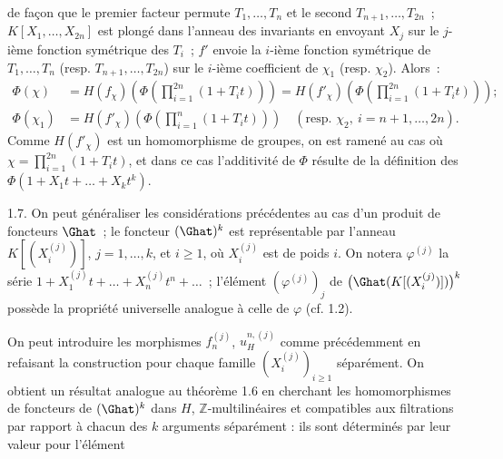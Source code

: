 
de façon que le
premier facteur permute \(T_1,\ldots,T_n\) et le second \(T_{n+1},\ldots,T_{2n}\)~; \(K[X_1,\ldots,X_{2n}]\) est plongé dans l'anneau des invariants en envoyant \(X_j\) sur le \(j\)-ième fonction symétrique des \(T_i\)~; \(f'\) envoie la \(i\)-ième fonction symétrique de \(T_1,\ldots,T_n\) (resp. \(T_{n+1},\ldots,T_{2n}\)) sur le \(i\)-ième coefficient de \(\chi_1\) (resp. \(\chi_2\)). Alors~:
\[
\begin{aligned}
\Phi(\chi)
&=H(f_\chi)\left(\Phi\left(\prod_{i=1}^{2n}(1+T_it)\right)\right)
=H(f'_\chi)\left(\Phi\left(\prod_{i=1}^{2n}(1+T_it)\right)\right);\\
\Phi(\chi_1) &=H(f'_\chi)\left(\Phi\left(\prod_{i=1}^{n}(1+T_it)\right)\right)\quad(\text{resp. }\chi_2,\ i=n+1,\ldots,2n).
\end{aligned}
\]
Comme \(H(f'_\chi)\) est un homomorphisme de groupes, on est ramené au cas où \(\chi=\prod_{i=1}^{2n}(1+T_it)\), et dans ce cas l'additivité de \(\Phi\) résulte de la définition des \(\Phi(1+X_1t+\ldots+X_k t^k)\).

1.7. On peut généraliser les considérations précédentes au cas d'un produit de foncteurs \(\Ghat\)~; le foncteur \((\Ghat)^k\) est représentable par l'anneau
\(K[(X_i^{(j)})]\), \(j=1,\ldots,k\), et \(i\geq 1\), où \(X_i^{(j)}\) est de poids \(i\). On notera \(\varphi^{(j)}\) la série \(1+X_1^{(j)}t+\ldots+X_n^{(j)}t^n+\ldots\)~; l'élément \((\varphi^{(j)})_j\) de \(\bigl(\Ghat(K[(X_i^{(j)})])\bigr)^k\) possède la propriété universelle analogue à celle de \(\varphi\) (cf. 1.2).

On peut introduire les morphismes \(f_n^{(j)}\), \(u_H^{n,(j)}\) comme précédemment en refaisant la construction pour chaque famille \((X_i^{(j)})_{i\geq 1}\) séparément. On obtient un résultat analogue au théorème 1.6 en cherchant les homomorphismes de foncteurs de \((\Ghat)^k\) dans \(H\), \(\mathbb Z\)-multilinéaires et compatibles aux filtrations par rapport à chacun des \(k\) arguments séparément : ils sont déterminés par leur valeur pour l'élément
